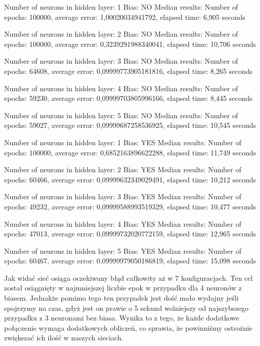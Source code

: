 \begin{scriptsize}  
  Number of neurons in hidden layer: 1
  Bias: NO
  Median results:
  Number of epochs: 100000, average error: 1,00020034941792, elapsed time: 6,905 seconds
  
  Number of neurons in hidden layer: 2
  Bias: NO
  Median results:
  Number of epochs: 100000, average error: 0,3239291988340041, elapsed time: 10,706 seconds
  
  Number of neurons in hidden layer: 3
  Bias: NO
  Median results:
  Number of epochs: 64608, average error: 0,09999773905181816, elapsed time: 8,265 seconds
  
  Number of neurons in hidden layer: 4
  Bias: NO
  Median results:
  Number of epochs: 59230, average error: 0,09999703805996166, elapsed time: 8,445 seconds
  
  Number of neurons in hidden layer: 5
  Bias: NO
  Median results:
  Number of epochs: 59027, average error: 0,09999687258536925, elapsed time: 10,545 seconds
  
  Number of neurons in hidden layer: 1
  Bias: YES
  Median results:
  Number of epochs: 100000, average error: 0,6852163896622288, elapsed time: 11,749 seconds
  
  Number of neurons in hidden layer: 2
  Bias: YES
  Median results:
  Number of epochs: 60466, average error: 0,09999632349029491, elapsed time: 10,212 seconds
  
  Number of neurons in hidden layer: 3
  Bias: YES
  Median results:
  Number of epochs: 49232, average error: 0,09999588993519329, elapsed time: 10,477 seconds
  
  Number of neurons in hidden layer: 4
  Bias: YES
  Median results:
  Number of epochs: 47013, average error: 0,09999732020772159, elapsed time: 12,965 seconds
  
  Number of neurons in hidden layer: 5
  Bias: YES
  Median results:
  Number of epochs: 60467, average error: 0,09999979050186819, elapsed time: 15,098 seconds
\end{scriptsize}

Jak widać sieć osiąga oczekiwany błąd całkowity aż w 7 konfiguracjach.
Ten cel został osiągnięty w najmniejszej liczbie epok w przypadku dla 4 neuronów z biasem.
Jednakże pomimo tego ten przypadek jest dość mało wydajny jeśli spojrzymy na czas, 
gdyż jest on prawie o 5 sekund wolniejszy od najszybszego przypadku z 3 neuronami bez biasa.
Wynika to z tego, że każde dodatkowe połączenie wymaga dodatkowych obliczeń,
co sprawia, że powinniśmy ostrożnie zwiększać ich ilość w naszych sieciach.